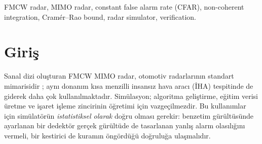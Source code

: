 \documentclass[conference,a4paper,10pt]{IEEEtran}
\begin{document}
\renewcommand{\abstractname}{Abstract}
\begin{abstract}
Radar simulators are widely used to develop and teach FMCW MIMO signal processing, but their statistical fidelity is rarely verified. We present RadarLab, an open-source simulator with a NumPy reference implementation and an interactive TypeScript twin running in the browser, whose numerical equivalence is checked by cross-language golden test vectors. We verify the simulator against independent closed-form theory, reported separately from implementation self-consistency checks: false-alarm and detection probabilities for non-coherent integration over $K$ virtual channels, and the efficiency of range, velocity and angle estimators with respect to the Cramér--Rao bound. Using the known exact CFAR thresholds for Gamma-distributed noise, we quantify a common pitfall: applying the single-channel CA-CFAR factor after summing the powers of $K$ channels raises the threshold by 4.1--6.1~dB for $K=4$--$8$ and $N=16$--$32$ training cells, which costs 3.9--7.4~dB of detection SNR. We also measure the effect of Hann-window correlation between training cells on the false-alarm rate.
\end{abstract}
\renewcommand{\IEEEkeywordsname}{Keywords}
\begin{IEEEkeywords}
FMCW radar, MIMO radar, constant false alarm rate (CFAR), non-coherent integration, Cramér--Rao bound, radar simulator, verification.
\end{IEEEkeywords}

\section{Giriş}
Sanal dizi oluşturan FMCW MIMO radar, otomotiv radarlarının standart mimarisidir \cite{patole2017automotive,sun2020mimo}; aynı donanım kısa menzilli insansız hava aracı (İHA) tespitinde de giderek daha çok kullanılmaktadır. Simülasyon; algoritma geliştirme, eğitim verisi üretme ve işaret işleme zincirinin öğretimi için vazgeçilmezdir. Bu kullanımlar için simülatörün \emph{istatistiksel olarak} doğru olması gerekir: benzetim gürültüsünde ayarlanan bir dedektör gerçek gürültüde de tasarlanan yanlış alarm olasılığını vermeli, bir kestirici de kuramın öngördüğü doğruluğa ulaşmalıdır.
\end{document}
